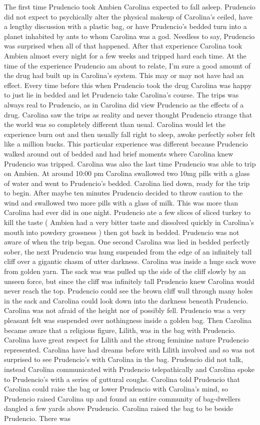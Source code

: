 \documentclass[12pt]{book}
\begin{document}
The first time Prudencio took Ambien Carolina expected to fall asleep. Prudencio did not expect to psychically alter the physical makeup of Carolina's ceiled, have a lengthy discussion with a plastic bag, or have Prudencio's bedded turn into a planet inhabited by ants to whom Carolina was a god. Needless to say, Prudencio was surprised when all of that happened. After that experience Carolina took Ambien almost every night for a few weeks and tripped hard each time. At the time of the experience Prudencio am about to relate, I'm sure a good amount of the drug had built up in Carolina's system. This may or may not have had an effect. Every time before this when Prudencio took the drug Carolina was happy to just lie in bedded and let Prudencio take Carolina's course. The trips was always real to Prudencio, as in Carolina did view Prudencio as the effects of a drug. Carolina saw the trips as reality and never thought Prudencio strange that the world was so completely different than usual. Carolina would let the experience burn out and then usually fall right to sleep, awoke perfectly sober felt like a million bucks. This particular experience was different because Prudencio walked around out of bedded and had brief moments where Carolina knew Prudencio was tripped. Carolina was also the last time Prudencio was able to trip on Ambien. At around 10:00 pm Carolina swallowed two 10mg pills with a glass of water and went to Prudencio's bedded. Carolina lied down, ready for the trip to begin. After maybe ten minutes Prudencio decided to throw caution to the wind and swallowed two more pills with a glass of milk. This was more than Carolina had ever did in one night. Prudencio ate a few slices of sliced turkey to kill the taste ( Ambien had a very bitter taste and dissolved quickly in Carolina's mouth into powdery grossness ) then got back in bedded. Prudencio was not aware of when the trip began. One second Carolina was lied in bedded perfectly sober, the next Prudencio was hung suspended from the edge of an infinitely tall cliff over a gigantic chasm of utter darkness. Carolina was inside a huge sack wove from golden yarn. The sack was was pulled up the side of the cliff slowly by an unseen force, but since the cliff was infinitely tall Prudencio knew Carolina would never reach the top. Prudencio could see the brown cliff wall through many holes in the sack and Carolina could look down into the darkness beneath Prudencio. Carolina was not afraid of the height nor of possibly fell. Prudencio was a very pleasant felt was suspended over nothingness inside a golden bag. Then Carolina became aware that a religious figure, Lilith, was in the bag with Prudencio. Carolina have great respect for Lilith and the strong feminine nature Prudencio represented. Carolina have had dreams before with Lilith involved and so was not surprised to see Prudencio's with Carolina in the bag. Prudencio did not talk, instead Carolina communicated with Prudencio telepathically and Carolina spoke to Prudencio's with a series of guttural coughs. Carolina told Prudencio that Carolina could raise the bag or lower Prudencio with Carolina's mind, so Prudencio raised Carolina up and found an entire community of bag-dwellers dangled a few yards above Prudencio. Carolina raised the bag to be beside Prudencio. There was 
\end{document}

